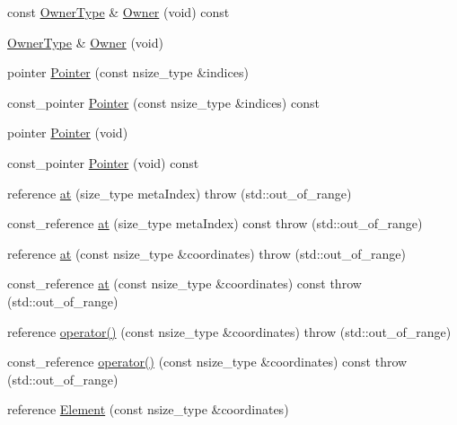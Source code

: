 \begin{DoxyCompactItemize}
\item 
const \hyperlink{classvct_dynamic_const_n_array_base_aad4328d01dc43be4b9047d594ed2ae8d}{Owner\+Type} \& \hyperlink{classvct_dynamic_n_array_base_a891190414183e5195fa8d12325c1bddd}{Owner} (void) const 
\item 
\hyperlink{classvct_dynamic_const_n_array_base_aad4328d01dc43be4b9047d594ed2ae8d}{Owner\+Type} \& \hyperlink{classvct_dynamic_n_array_base_ac4a9c4cedda9a2f8e794f913211b6f97}{Owner} (void)
\item 
pointer \hyperlink{classvct_dynamic_n_array_base_a815d8e920b006130a100225bd9d0b5ab}{Pointer} (const nsize\+\_\+type \&indices)
\item 
const\+\_\+pointer \hyperlink{classvct_dynamic_n_array_base_ad6ac2380e5d4b30c218878998e775c76}{Pointer} (const nsize\+\_\+type \&indices) const 
\item 
pointer \hyperlink{classvct_dynamic_n_array_base_af34333ee2ce4b7229ce27949643a430c}{Pointer} (void)
\item 
const\+\_\+pointer \hyperlink{classvct_dynamic_n_array_base_a2ef4c81d62183d24e859be570a6f6f86}{Pointer} (void) const 
\item 
reference \hyperlink{classvct_dynamic_n_array_base_a72c22020326e95f1914a5250e8dca9dd}{at} (size\+\_\+type meta\+Index)  throw (std\+::out\+\_\+of\+\_\+range)
\item 
const\+\_\+reference \hyperlink{classvct_dynamic_n_array_base_a0fc646058ec86e1256dc02131c3f5d42}{at} (size\+\_\+type meta\+Index) const   throw (std\+::out\+\_\+of\+\_\+range)
\item 
reference \hyperlink{classvct_dynamic_n_array_base_abac9495fd15f5f0496b2c3d76beddfb5}{at} (const nsize\+\_\+type \&coordinates)  throw (std\+::out\+\_\+of\+\_\+range)
\item 
const\+\_\+reference \hyperlink{classvct_dynamic_n_array_base_a8bf49f4e938b24befef617c24a7b8633}{at} (const nsize\+\_\+type \&coordinates) const   throw (std\+::out\+\_\+of\+\_\+range)
\item 
reference \hyperlink{classvct_dynamic_n_array_base_a1ee205787762a94a8b3f88add005fd2b}{operator()} (const nsize\+\_\+type \&coordinates)  throw (std\+::out\+\_\+of\+\_\+range)
\item 
const\+\_\+reference \hyperlink{classvct_dynamic_n_array_base_ab64ae472f6333bc618acdf8b50e8238a}{operator()} (const nsize\+\_\+type \&coordinates) const   throw (std\+::out\+\_\+of\+\_\+range)
\item 
reference \hyperlink{classvct_dynamic_n_array_base_ac0158fc2557971ecb7d25d73e2c084ba}{Element} (const nsize\+\_\+type \&coordinates)

\end{DoxyCompactItemize}
